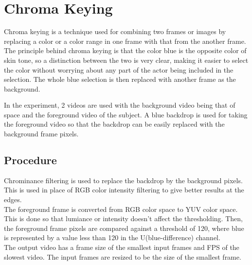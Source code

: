 \documentclass[12pt]{article}
\begin{document}
\clearpage 
\section{Chroma Keying}
Chroma keying is a technique used for combining two frames or images by replacing a color or a color range in one frame with that from the another frame. The principle behind chroma keying is that the color blue is the opposite color of skin tone, so a distinction between the two is very clear, making it easier to select the color without worrying about any part of the actor being included in the selection. The whole blue selection is then replaced with another frame as the background.

In the experiment, 2 videos are used with the background video being that of space and the foreground video of the subject. A blue backdrop is used for taking the foreground video so that the backdrop can be easily replaced with the background frame pixels.

\subsection{Procedure}
Chrominance filtering is used to replace the backdrop by the background pixels. This is used in place of RGB color intensity filtering to give better results at the edges. \\
The foreground frame is converted from RGB color space to YUV color space. This is done so that lumiance or intensity doesn't affect the thresholding. Then, the foreground frame pixels are compared against a threshold of 120, where blue is represented by a value less than 120 in the U(blue-difference) channel. \\

The output video has a frame size of the smallest input frames and FPS of the slowest video. The input frames are resized to be the size of the smallest frame.
\end{document}

